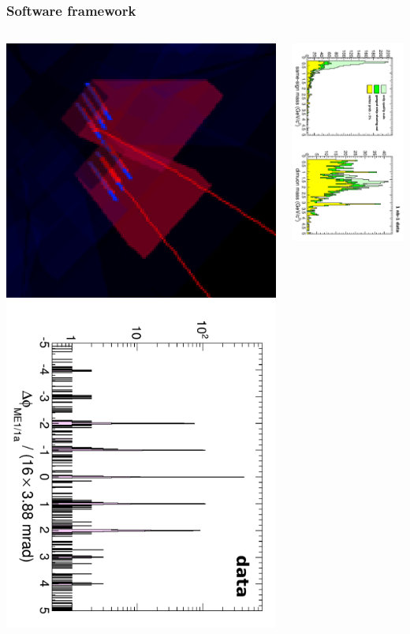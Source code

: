 \documentclass[compress]{beamer}
\begin{document}
\begin{frame}
\frametitle{Software framework}

\begin{columns}

\includegraphics[width=0.45\linewidth]{triplet_closeup.png}
\includegraphics[height=0.55\linewidth, angle=90]{gangedstripcut.pdf}

\vspace{0.3 cm}
\includegraphics[height=\linewidth, angle=90]{gangedstripcut_mass.pdf}


\end{columns}
\end{frame}
\end{document}

